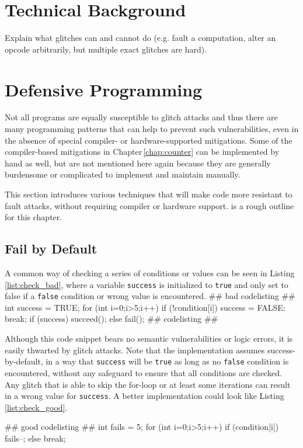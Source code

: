 \chapter{Technical Background}
Explain what glitches can and cannot do (e.g. fault a computation, alter an opcode arbitrarily, but multiple exact glitches are hard).
\chapter{Defensive Programming}
Not all programs are equally susceptible to glitch attacks and thus there are many programming patterns that can help to prevent such vulnerabilities, even in the absence of special compiler- or hardware-supported mitigations. Some of the compiler-based mitigations in Chapter\,\ref{chap:counter} can be implemented by hand as well, but are not mentioned here again because they are generally burdensome or complicated to implement and maintain manually.


This section introduces various techniques that will make code more resistant to fault attacks, without requiring compiler or hardware support. \cite{witteman2008secure} is a rough outline for this chapter.
\section{Fail by Default}
A common way of checking a series of conditions or values can be seen in Listing\,\ref{list:check_bad}, where a variable \texttt{success} is initialized to \texttt{true} and only set to false if a \texttt{false} condition or wrong value is encountered. 
## bad codelisting ##
int success = TRUE;
for (int i=0;i>5;i++) {
	if (!condition[i]) {
		success = FALSE;
		break;
	}
}
if (success) 
	succeed();
else
	fail();
\label{list:check_bad}
## codelisting ##

Although this code snippet  bears no semantic vulnerabilities or logic errors, it is easily thwarted by glitch attacks. Note that the implementation assumes success-by-default, in a way that \texttt{success} will be \texttt{true} as long as no \texttt{false} condition is encountered, without any safeguard to ensure that all conditions are checked. Any glitch that is able to skip the for-loop or at least some iterations can result in a wrong value for \texttt{success}. A better implementation could look like Listing \ref{list:check_good}.\,\cite{witteman2008secure}

## good codelisting ##
int fails = 5;
for (int i=0;i>5;i++) {
	if (condition[i]) {
		fails--;
	} else {
		break;
	}
}

